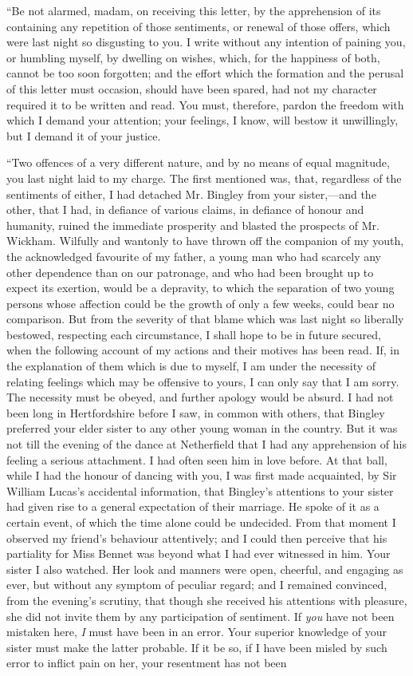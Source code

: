 \documentclass[12pt,openright]{book}
\begin{document}
“Be not alarmed, madam, on receiving this letter, by the apprehension of its containing any repetition of those sentiments, or renewal of those offers, which were last night so disgusting to you. I write without any intention of paining you, or humbling myself, by dwelling on wishes, which, for the happiness of both, cannot be too soon forgotten; and the effort which the formation and the perusal of this letter must occasion, should have been spared, had not my character required it to be written and read. You must, therefore, pardon the freedom with which I demand your attention; your feelings, I know, will bestow it unwillingly, but I demand it of your justice.

“Two offences of a very different nature, and by no means of equal magnitude, you last night laid to my charge. The first mentioned was, that, regardless of the sentiments of either, I had detached Mr. Bingley from your sister,—and the other, that I had, in defiance of various claims, in defiance of honour and humanity, ruined the immediate prosperity and blasted the prospects of Mr. Wickham. Wilfully and wantonly to have thrown off the companion of my youth, the acknowledged favourite of my father, a young man who had scarcely any other dependence than on our patronage, and who had been brought up to expect its exertion, would be a depravity, to which the separation of two young persons whose affection could be the growth of only a few weeks, could bear no comparison. But from the severity of that blame which was last night so liberally bestowed, respecting each circumstance, I shall hope to be in future secured, when the following account of my actions and their motives has been read. If, in the explanation of them which is due to myself, I am under the necessity of relating feelings which may be offensive to yours, I can only say that I am sorry. The necessity must be obeyed, and further apology would be absurd. I had not been long in Hertfordshire before I saw, in common with others, that Bingley preferred your elder sister to any other young woman in the country. But it was not till the evening of the dance at Netherfield that I had any apprehension of his feeling a serious attachment. I had often seen him in love before. At that ball, while I had the honour of dancing with you, I was first made acquainted, by Sir William Lucas’s accidental information, that Bingley’s attentions to your sister had given rise to a general expectation of their marriage. He spoke of it as a certain event, of which the time alone could be undecided. From that moment I observed my friend’s behaviour attentively; and I could then perceive that his partiality for Miss Bennet was beyond what I had ever witnessed in him. Your sister I also watched. Her look and manners were open, cheerful, and engaging as ever, but without any symptom of peculiar regard; and I remained convinced, from the evening’s scrutiny, that though she received his attentions with pleasure, she did not invite them by any participation of sentiment. If \textit{you} have not been mistaken here, \textit{I} must have been in an error. Your superior knowledge of your sister must make the latter probable. If it be so, if I have been misled by such error to inflict pain on her, your resentment has not been 
\end{document}
